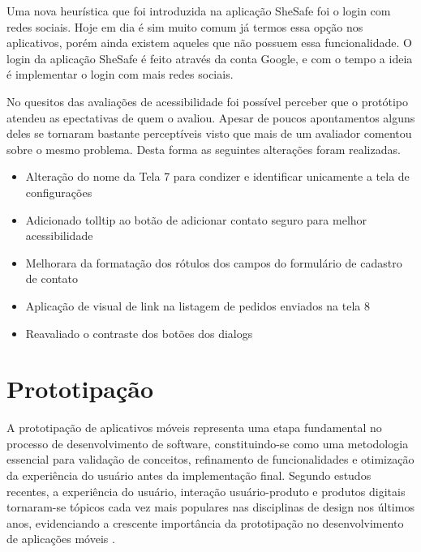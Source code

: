 Uma nova heurística que foi introduzida na aplicação SheSafe foi o login com redes sociais. Hoje em dia é sim muito comum já termos essa opção nos aplicativos, porém ainda existem aqueles que não possuem essa funcionalidade. O login da aplicação SheSafe é feito através da conta Google, e com o tempo a ideia é implementar o login com mais redes sociais.

No quesitos das avaliações de acessibilidade foi possível perceber que o protótipo atendeu as epectativas de quem o avaliou. Apesar de poucos apontamentos alguns deles se tornaram bastante perceptíveis visto que mais de um avaliador comentou sobre o mesmo problema. Desta forma as seguintes alterações foram realizadas.

\begin{itemize}
\item Alteração do nome da Tela 7 para condizer e identificar unicamente a tela de configurações
\item Adicionado tolltip ao botão de adicionar contato seguro para melhor acessibilidade
\item Melhorara da formatação dos rótulos dos campos do formulário de cadastro de contato
\item Aplicação de visual de link na listagem de pedidos enviados na tela 8
\item Reavaliado o contraste dos botões dos dialogs
\end{itemize}

\section{Prototipação}

A prototipação de aplicativos móveis representa uma etapa fundamental no processo de desenvolvimento de software, constituindo-se como uma metodologia essencial para validação de conceitos, refinamento de funcionalidades e otimização da experiência do usuário antes da implementação final. Segundo estudos recentes, a experiência do usuário, interação usuário-produto e produtos digitais tornaram-se tópicos cada vez mais populares nas disciplinas de design nos últimos anos, evidenciando a crescente importância da prototipação no desenvolvimento de aplicações móveis \cite{sciencedirect_design_approaches}.

